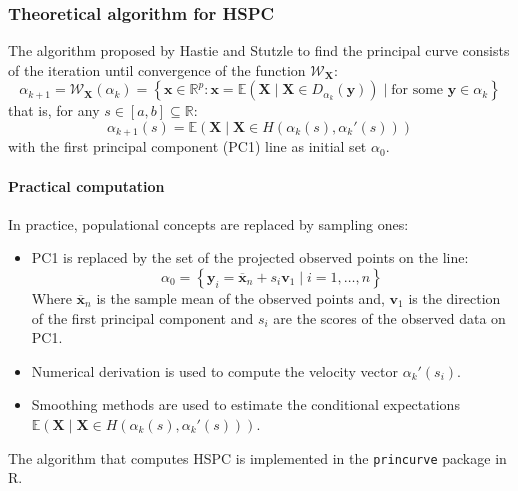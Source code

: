 \subsubsection{Theoretical algorithm for HSPC}

The algorithm proposed by Hastie and Stutzle to find the principal curve
consists of the iteration until convergence of the function $\mathcal W_{\boldsymbol X}$:
\begin{equation*}
	\alpha_{k+1} = \mathcal W_{\boldsymbol X}(\alpha_k) =
	\left\{
	\boldsymbol x \in \mathds{R}^p : \boldsymbol x = \mathds{E}(\boldsymbol X \mid \boldsymbol X \in
	D_{\alpha_k}(\boldsymbol y)) \mid \text{for some }\boldsymbol y \in \alpha_k
	\right\}
\end{equation*}
that is, for any $s \in [a, b] \subseteq \mathds{R}$:
\begin{equation*}
	\alpha_{k+1}(s) = \mathds{E}(\boldsymbol X \mid \boldsymbol X \in H(\alpha_k(s), \alpha_k'(s)))
\end{equation*}
with the first principal component (PC1) line as initial set $\alpha_0$.

\paragraph{Practical computation}
In practice, populational concepts are replaced by sampling ones:
\begin{itemize}
	\item PC1 is replaced by the set of the projected observed points on the line:
	      \begin{equation*}
		      \alpha_0 = \left\{
		      \boldsymbol y_i = \boldsymbol{\overline{x}}_n + s_i \boldsymbol{v}_1 \mid i = 1, \dots, n
		      \right\}
	      \end{equation*}
	      Where $\boldsymbol{\overline{x}}_n$ is the sample mean of the observed points and, $\boldsymbol{v}_1$
	      is the direction of the first principal component and $s_i$ are the scores of the observed
	      data on PC1.
	\item Numerical derivation is used to compute the velocity vector $\alpha_k'(s_i)$.
	\item Smoothing methods are used to estimate the conditional expectations
	      $\mathds{E}(\boldsymbol X \mid \boldsymbol X \in H(\alpha_k(s), \alpha_k'(s)))$.
\end{itemize}
\begin{note}
	The algorithm that computes HSPC is implemented in the \texttt{princurve} package in R.
\end{note}

